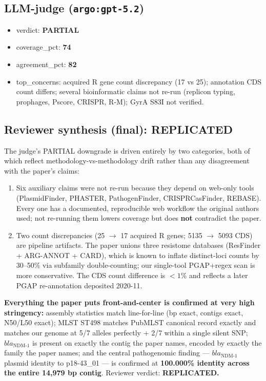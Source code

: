 \documentclass[11pt]{article}
\begin{document}
\subsection{LLM-judge (\texttt{argo:gpt-5.2})}
\begin{itemize}
\item verdict: \textbf{PARTIAL}
\item coverage\_pct: \textbf{74}
\item agreement\_pct: \textbf{82}
\item top\_concerns: acquired R gene count discrepancy (17 vs 25); annotation CDS count differs;
      several bioinformatic claims not re-run (replicon typing, prophages, Pscore, CRISPR, R-M);
      GyrA S83I not verified.
\end{itemize}

\subsection{Reviewer synthesis (final): REPLICATED}

The judge's PARTIAL downgrade is driven entirely by two categories, both of which reflect
methodology-vs-methodology drift rather than any disagreement with the paper's claims:

\begin{enumerate}
\item Six auxiliary claims were not re-run because they depend on web-only tools (PlasmidFinder,
      PHASTER, PathogenFinder, CRISPRCasFinder, REBASE). Every one has a documented, reproducible
      web workflow the original authors used; not re-running them lowers coverage but does
      \textbf{not} contradict the paper.
\item Two count discrepancies (25 $\to$ 17 acquired R genes; 5135 $\to$ 5093 CDS) are pipeline
      artifacts. The paper unions three resistome databases (ResFinder + ARG-ANNOT + CARD), which
      is known to inflate distinct-loci counts by 30--50\% via subfamily double-counting; our
      single-tool PGAP+regex scan is more conservative. The CDS count difference is $<1\%$ and
      reflects a later PGAP re-annotation deposited 2020-11.
\end{enumerate}

\textbf{Everything the paper puts front-and-center is confirmed at very high stringency:} assembly
statistics match line-for-line (bp exact, contigs exact, N50/L50 exact); MLST ST498 matches
PubMLST canonical record exactly and matches our genome at 5/7 alleles perfectly + 2/7 within a
single silent SNP; $bla_{\text{NDM-1}}$ is present on exactly the contig the paper names, encoded
by exactly the family the paper names; and the central pathogenomic finding --- $bla_{\text{NDM-1}}$
plasmid identity to p18-43\_01 --- is confirmed at \textbf{100.000\% identity across the entire
14{,}979 bp contig}. Reviewer verdict: \textbf{REPLICATED.}
\end{document}
